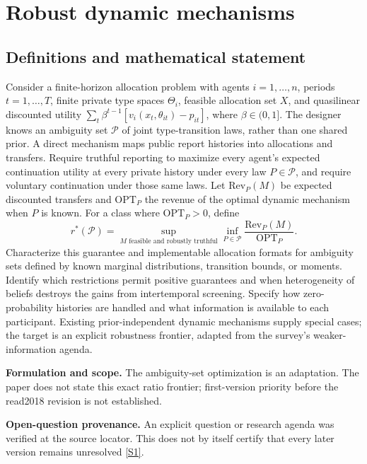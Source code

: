 \documentclass[11pt]{article}
\newcommand{\sref}[2]{\hyperlink{source:#1:#2}{[S#2]}}
\begin{document}
\section*{Robust dynamic mechanisms}\label{30007572}
\subsection{Definitions and mathematical statement}
Consider a finite-horizon allocation problem with agents \(i=1,\ldots,n\), periods \(t=1,\ldots,T\), finite private type spaces \(\Theta_i\), feasible allocation set \(X\), and quasilinear discounted utility \(\sum_t\beta^{t-1}[v_i(x_t,\theta_{it})-p_{it}]\), where \(\beta\in(0,1]\). The designer knows an ambiguity set \(\mathcal P\) of joint type-transition laws, rather than one shared prior. A direct mechanism maps public report histories into allocations and transfers. Require truthful reporting to maximize every agent's expected continuation utility at every private history under every law \(P\in\mathcal P\), and require voluntary continuation under those same laws. Let \(\mathrm{Rev}_P(M)\) be expected discounted transfers and \(\mathrm{OPT}_P\) the revenue of the optimal dynamic mechanism when \(P\) is known. For a class where \(\mathrm{OPT}_P>0\), define
\[
 r^*(\mathcal P)=\sup_{M\text{ feasible and robustly truthful}}
 \inf_{P\in\mathcal P}\frac{\mathrm{Rev}_P(M)}{\mathrm{OPT}_P}.
\]
Characterize this guarantee and implementable allocation formats for ambiguity sets defined by known marginal distributions, transition bounds, or moments. Identify which restrictions permit positive guarantees and when heterogeneity of beliefs destroys the gains from intertemporal screening. Specify how zero-probability histories are handled and what information is available to each participant. Existing prior-independent dynamic mechanisms supply special cases; the target is an explicit robustness frontier, adapted from the survey’s weaker-information agenda.

\par\textbf{Formulation and scope.} The ambiguity-set optimization is an adaptation. The paper does not state this exact ratio frontier; first-version priority before the read2018 revision is not established.

\par\textbf{Open-question provenance.} An explicit question or research agenda was verified at the source locator. This does not by itself certify that every later version remains unresolved \sref{30007572}{1}.
\end{document}
